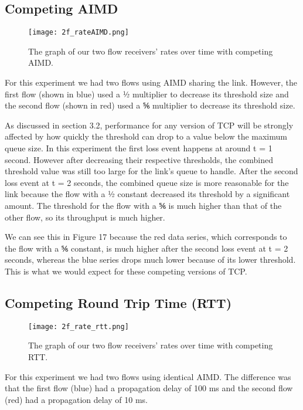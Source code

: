 \documentclass[11pt]{article}
\begin{document}
\subsection{Competing AIMD}

\begin{figure}[H]
\caption{The graph of our two flow receivers' rates over time with competing AIMD.}
  \label{figure15}
    \centering
    \texttt{[image: 2f\_rateAIMD.png]}
\end{figure}

For this experiment we had two flows using AIMD sharing the link. However, the first flow (shown in blue) used a ½ multiplier to decrease its threshold size and the second flow (shown in red) used a ⅚ multiplier to decrease its threshold size.

As discussed in section 3.2, performance for any version of TCP will be strongly affected by how quickly the threshold can drop to a value below the maximum queue size. In this experiment the first loss event happens at around t = 1 second. However after decreasing their respective thresholds, the combined threshold value was still too large for the link’s queue to handle. After the second loss event at t = 2 seconds, the combined queue size is more reasonable for the link because the flow with a ½ constant decreased its threshold by a significant amount. The threshold for the flow with a ⅚ is much higher than that of the other flow, so its throughput is much higher.

We can see this in Figure 17 because the red data series, which corresponds to the flow with a ⅚ constant, is much higher after the second loss event at t = 2 seconds, whereas the blue series drops much lower because of its lower threshold. This is what we would expect for these competing versions of TCP.

\subsection{Competing Round Trip Time (RTT)}

\begin{figure}[H]
\caption{The graph of our two flow receivers' rates over time with competing RTT.}
  \label{figure16}
    \centering
    \texttt{[image: 2f\_rate\_rtt.png]}
\end{figure}

For this experiment we had two flows using identical AIMD. The difference was that the first flow (blue) had a propagation delay of 100 ms and the second flow (red) had a propagation delay of 10 ms. 
\end{document}
